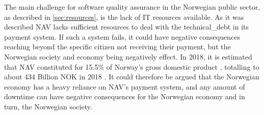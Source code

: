 The main challenge for software quality assurance in the Norwegian public sector, as described in \autoref{sec:resources}, is the lack of IT resources available. As it was described NAV lacks sufficient resources to deal with the \gls{technical_debt} in its payment system. If such a system fails, it could have negative consequences reaching beyond the specific citizen not receiving their payment, but the Norwegian society and economy being negatively effect. In 2018, it is estimated that NAV constituted for 15.5\% of Norway's gross domestic product \cite{nav_ytelsene_frem_mot_2060_2019}, totalling to about 434 Billion NOK in 2018 \cite{faktaark_finansdepartementet_2020}. It could therefore be argued that the Norwegian economy has a heavy reliance on NAV's payment system, and any amount of downtime can have negative consequences for the Norwegian economy and in turn, the Norwegian society.



